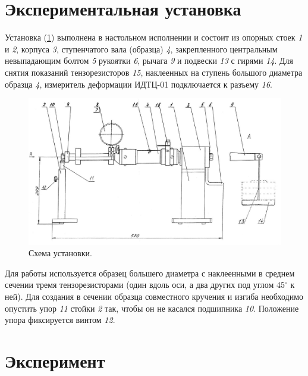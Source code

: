 \documentclass[12pt, a4paper]{article}
\begin{document}
    \newpage
    
    \section{Экспериментальная установка}
    
    Установка (\ref{im1}) выполнена в настольном исполнении и состоит из опорных стоек \textit{1} и \textit{2}, корпуса \textit{3}, ступенчатого вала (образца) \textit{4}, закрепленного центральным невыпадающим болтом \textit{5} рукоятки \textit{6}, рычага \textit{9} и подвески \textit{13} с гирями \textit{14}. Для снятия показаний тензорезисторов \textit{15}, наклеенных на ступень большого диаметра образца \textit{4}, измеритель деформации ИДТЦ-01 подключается к разъему \textit{16}.
    
    \begin{figure}[h]
        \centering
        \includegraphics[width = 15cm]{image_1.jpg}
        \caption{Схема установки.}
        \label{im1}
    \end{figure}
    
    Для работы используется образец большего диаметра с наклеенными в среднем сечении тремя тензорезисторами (один вдоль оси, а два других под углом $45^{\circ}$ к ней). Для создания в сечении образца совместного кручения и изгиба необходимо опустить упор \textit{11} стойки \textit{2} так, чтобы он не касался подшипника \textit{10}. Положение упора фиксируется винтом \textit{12}.
    
    \newpage
    
    \section{Эксперимент}
    
\end{document}
